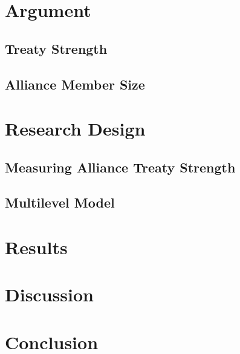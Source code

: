 \documentclass[12pt]{article}
\begin{document}
\section{Argument}



\subsection{Treaty Strength}



\subsection{Alliance Member Size} 




\section{Research Design} 


\subsection{Measuring Alliance Treaty Strength} 



\subsection{Multilevel Model} 



\section{Results}




\section{Discussion}



\section{Conclusion}



%  
 
\end{document}

